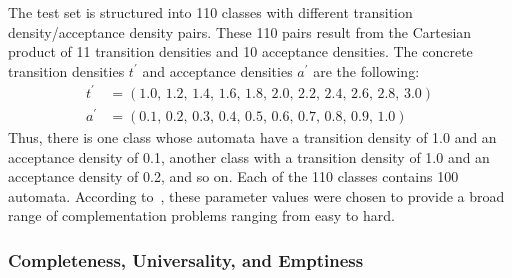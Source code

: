 The \goal{} test set is structured into 110 classes with different transition density/acceptance density pairs. These 110 pairs result from the Cartesian product of 11 transition densities and 10 acceptance densities. The concrete transition densities $t^\prime$ and acceptance densities $a^\prime$ are the following:
\begin{align*}
t^\prime & = \left( 1.0,\,1.2,\,1.4,\,1.6,\,1.8,\,2.0,\,2.2,\,2.4,\,2.6,\,2.8,\,3.0 \right) \\
a^\prime & = \left( 0.1,\,0.2,\,0.3,\,0.4,\,0.5,\,0.6,\,0.7,\,0.8,\,0.9,\,1.0 \right)
\end{align*}
Thus, there is one class whose automata have a transition density of 1.0 and an acceptance density of 0.1, another class with a transition density of 1.0 and an acceptance density of 0.2, and so on. Each of the 110 classes contains 100 automata. According to~\cite{2011_tsai}, these parameter values were chosen to provide a broad range of complementation problems ranging from easy to hard.


\subsubsection{Completeness, Universality, and Emptiness}


